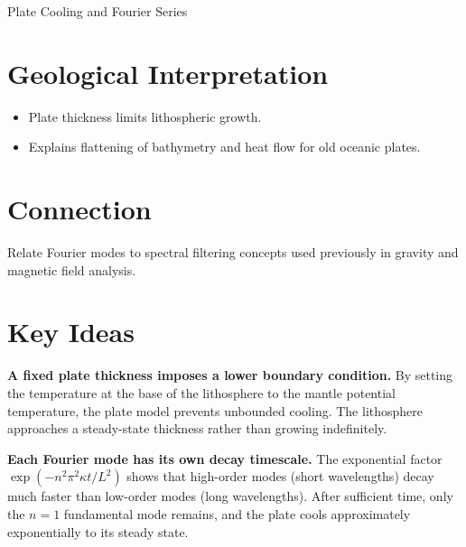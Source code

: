 \begin{activity}{Plate Cooling and Fourier Series}
\section*{Geological Interpretation}
\begin{itemize}
  \item Plate thickness limits lithospheric growth.
  \item Explains flattening of bathymetry and heat flow for old oceanic plates.
\end{itemize}

\section*{Connection}
Relate Fourier modes to spectral filtering concepts used previously in gravity
and magnetic field analysis.

\answerbox[3cm]

{\color{red}
\section*{Key Ideas}

\textbf{A fixed plate thickness imposes a lower boundary condition.} By setting the temperature at the base of the lithosphere to the mantle potential temperature, the plate model prevents unbounded cooling. The lithosphere approaches a steady-state thickness rather than growing indefinitely.

{\color{blue}
\textbf{Each Fourier mode has its own decay timescale.} The exponential factor $\exp(-n^2\pi^2\kappa t/L^2)$ shows that high-order modes (short wavelengths) decay much faster than low-order modes (long wavelengths). After sufficient time, only the $n=1$ fundamental mode remains, and the plate cools approximately exponentially to its steady state.

\begin{figure}[h]
\centering
{}
\end{figure}}}
\end{activity}
